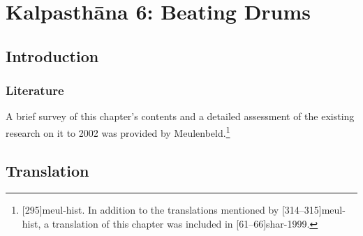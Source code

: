 \chapter{Kalpasthāna 6: Beating Drums}
\label{dundubhi}

\section{Introduction}

\subsection{Literature}

A brief survey of this chapter's contents and a detailed assessment
of the existing research on it to 2002 was provided by
Meulenbeld.\footnote{[295]{meul-hist}. In addition to the
    translations mentioned by [314--315]{meul-hist}, a
    translation of this chapter was included in
    [61--66]{shar-1999}.}

\section{Translation}

